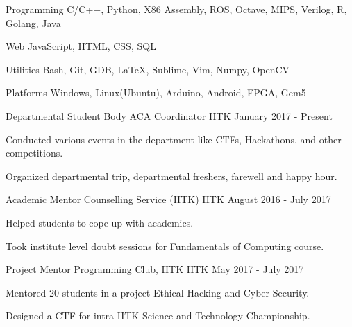 \documentclass[12pt, a4paper]{awesome-cv}
\begin{document}
\begin{cvskills}


  \cvskill
  {Programming}
  {C/C++, Python, X86 Assembly, ROS, Octave, MIPS, Verilog, R, Golang, Java }


  \cvskill
  {Web}
  {JavaScript, HTML, CSS, SQL}


  \cvskill
  {Utilities}
  {Bash, Git, GDB, \LaTeX, Sublime, Vim, Numpy, OpenCV}
  
  \cvskill
  {Platforms}
  {Windows, Linux(Ubuntu), Arduino, Android, FPGA, Gem5}
\end{cvskills}



\begin{cventries}

  \cventry
  {Departmental Student Body}
  {ACA Coordinator}
  {IITK}
  {January 2017 - Present}
  {
    \begin{cvitems}
    \item Conducted various events in the department like CTFs, Hackathons, and other competitions.
    \item Organized departmental trip, departmental freshers, farewell and happy hour.
    \end{cvitems}
  }
    \vspace{0.2cm}
  \cventry
    {Academic Mentor}
    {Counselling Service (IITK)}
    {IITK}
    {August 2016 - July 2017}
    {
      \begin{cvitems}
        \item {Helped students to cope up with academics.}
        \item {Took institute level doubt sessions for Fundamentals of Computing course.}
      \end{cvitems}
    }
    \vspace{0.2cm}
  \cventry
  {Project Mentor}
  {Programming Club, IITK}
  {IITK}
  {May 2017 - July 2017}
  {
    \begin{cvitems}
    \item Mentored 20 students in a project Ethical Hacking and Cyber Security.
    \item Designed a CTF for intra-IITK Science and Technology Championship.
    \end{cvitems}
  }
\end{cventries}

\end{document}
